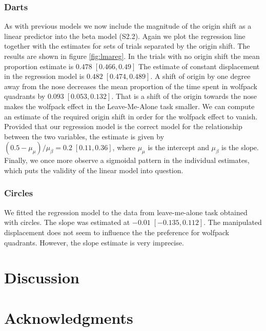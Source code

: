\documentclass[10pt]{article}
\begin{document}
\subsubsection*{Darts}
As with previous models we now include the magnitude of the origin shift as a linear predictor into the beta model (S2.2). 
Again we plot the regression line together with the estimates for sets of trials separated by the origin shift. 
The results are shown in figure \ref{fig:lmareg}. 
In the trials with no origin shift the mean proportion estimate is $0.478 \; [0.466,0.49]$ %
The estimate of constant displacement in the regression model is $0.482 \; [0.474,0.489]$. 
A shift of origin by one degree away from the nose decreases the mean proportion of the time spent in wolfpack quadrants by $0.093 \; [0.053,0.132]$. 
That is a shift of the origin towards the nose makes the wolfpack effect in the Leave-Me-Alone task smaller. 
We can compute an estimate of the required origin shift in order for the wolfpack effect to vanish. 
Provided that our regression model is the correct model for the relationship between the two variables, the estimate is given by $(0.5-\mu_\mu)/\mu_\beta = 0.2 \; [0.11,0.36] $, where $\mu_\mu$ is the intercept and $\mu_\beta$ is the slope.
\\
Finally, we once more observe a sigmoidal pattern in the individual estimates, which puts the validity of the linear model into question.\\

\subsubsection*{Circles}
We fitted the regression model to the data from leave-me-alone task obtained with circles. 
The slope was estimated at $-0.01 \; [-0.135,0.112]$. 
The manipulated displacement does not seem to influence the the preference for wolfpack quadrants. 
However, the slope estimate is very imprecise.

\section*{Discussion} 


\section*{Acknowledgments}
\end{document}
